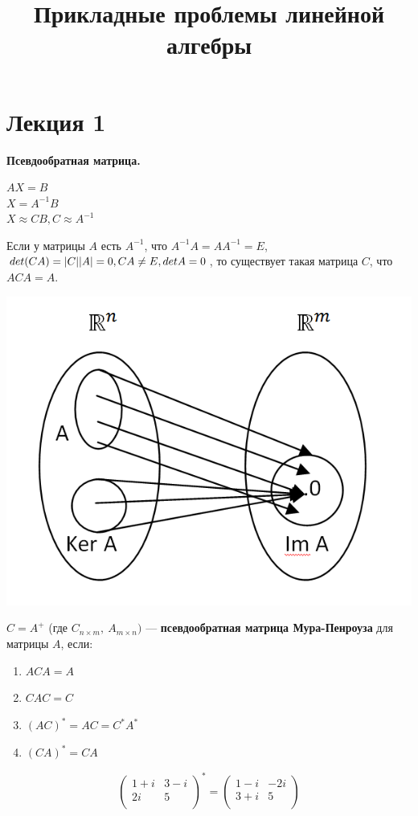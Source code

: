 \documentclass[12pt]{article}
\theoremstyle{definition}
\numberwithin{equation}{section}
\begin{document}
\title{Прикладные проблемы линейной алгебры}
\date{}
\maketitle \sloppy


\section *{Лекция 1}
\noindent \textbf{Псевдообратная матрица.}\\
\begin{center}
$AX=B$ \\
$X=A^{-1}B$ \\ 
$X\approx CB, C\approx A^{-1}$ \\
\end{center}
Если у матрицы $A$ есть $A^{-1}$, что $A^{-1}A=AA^{-1}=E$, 
$det(CA)=|C||A|=0, \\CA \neq E, detA=0$, 
то существует такая матрица $C$, что $ACA=A$.
\begin{center} \includegraphics[scale=0.5]{l1_1.png}
\end{center}
$C=A^+$ (где $C_{n \times m}, ~A_{m \times n})$ --- \textbf{псевдообратная матрица Мура-Пенроуза} для матрицы $A$, если:
\begin{enumerate}
\item $ACA=A$
\item $CAC=C$
\item $(AC)^*=AC=C^*A^*$
\item $(CA)^*=CA$
\end{enumerate}
\[\begin{pmatrix}
1+i & 3-i\\
2i & 5\\
\end{pmatrix}^* = \begin{pmatrix}
1-i & -2i\\
3+i & 5\\
\end{pmatrix}\]
\end{document}
